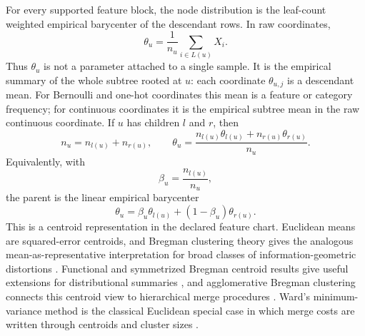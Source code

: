 For every supported feature block, the node distribution is the leaf-count
weighted empirical barycenter of the descendant rows. In raw coordinates,
\begin{equation}
\theta_u = \frac{1}{n_u}\sum_{i \in L(u)} X_i.
\end{equation}
Thus $\theta_u$ is not a parameter attached to a single sample. It is the
empirical summary of the whole subtree rooted at $u$: each coordinate
$\theta_{u,j}$ is a descendant mean. For Bernoulli and one-hot coordinates this
mean is a feature or category frequency; for continuous coordinates it is the
empirical subtree mean in the raw continuous coordinate.
If $u$ has children $l$ and $r$, then
\begin{equation}
n_u = n_{l(u)} + n_{r(u)},
\qquad
\theta_u = \frac{n_{l(u)} \theta_{l(u)} + n_{r(u)} \theta_{r(u)}}{n_u}.
\end{equation}
Equivalently, with
\[
\beta_u = \frac{n_{l(u)}}{n_u},
\]
the parent is the linear empirical barycenter
\begin{equation}
\theta_u
=
\beta_u \theta_{l(u)}
+
(1-\beta_u)\theta_{r(u)}.
\label{eq:barycentric-parent}
\end{equation}
This is a centroid representation in the declared feature chart. Euclidean
means are squared-error centroids, and Bregman clustering theory gives the
analogous mean-as-representative interpretation for broad classes of
information-geometric distortions \citep{banerjee2005clustering}. Functional
and symmetrized Bregman centroid results give useful extensions for
distributional summaries \citep{frigyik2008functional,nielsen2009sided}, and
agglomerative Bregman clustering connects this centroid view to hierarchical
merge procedures \citep{telgarsky2012agglomerative}. Ward's minimum-variance
method is the classical Euclidean special case in which merge costs are written
through centroids and cluster sizes \citep{ward1963hierarchical}.

